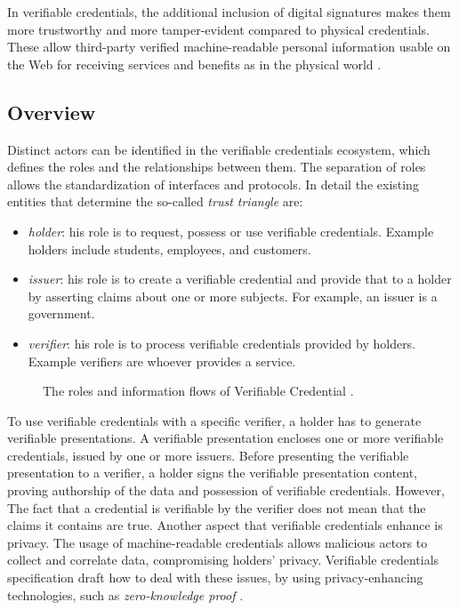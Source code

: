 In verifiable credentials, the additional inclusion of digital signatures makes them more trustworthy and more tamper-evident compared to physical credentials. These allow third-party verified machine-readable personal information usable on the Web for receiving services and benefits as in the physical world \cite{vcW3C}.

\subsection*{Overview}

Distinct actors can be identified in the verifiable credentials ecosystem, which defines the roles and the relationships between them. The separation of roles allows the standardization of interfaces and protocols. In detail the existing entities that determine the so-called \textit{trust triangle} \cite{trustOverIP} are: 

\begin{itemize}
    \item \textit{holder}: his role is to request, possess or use verifiable credentials. Example holders include students, employees, and customers.
    \item \textit{issuer}: his role is to create a verifiable credential and provide that to a holder by asserting claims about one or more subjects. For example, an issuer is a government. 
    \item \textit{verifier}: his role is to process verifiable credentials provided by holders. Example verifiers are whoever provides a service. 
\end{itemize}

\begin{figure}[h!]
    \centering
    
    \caption{The roles and information flows of Verifiable Credential \cite{vcW3C}.}
    \label{vcEcosystem}
\end{figure}

To use verifiable credentials with a specific verifier, a holder has to generate verifiable presentations.
A verifiable presentation encloses one or more verifiable credentials, issued by one or more issuers. Before presenting the verifiable presentation to a verifier, a holder signs the verifiable presentation content, proving authorship of the data and possession of verifiable credentials. 
However, The fact that a credential is verifiable by the verifier does not mean that the claims it contains are true. Another aspect that verifiable credentials enhance is privacy. 
The usage of machine-readable credentials allows malicious actors to collect and correlate data, compromising holders' privacy. 
Verifiable credentials specification draft how to deal with these issues, by using privacy-enhancing technologies, such as \textit{zero-knowledge proof} \cite{zkp-survey}. 

